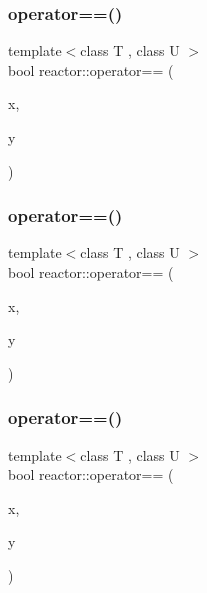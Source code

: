\mbox{\label{namespacereactor_ab9c3123244fedcd98c92e38874bee37d}} 
\subsubsection{\texorpdfstring{operator==()}{operator==()}\hspace{0.1cm}{\footnotesize\ttfamily [4/11]}}
{\footnotesize\ttfamily template$<$class T , class U $>$ \\
bool reactor\+::operator== (\begin{DoxyParamCaption}\item[{const \hyperlink{classreactor_1_1MutableValuePtr}{Mutable\+Value\+Ptr}$<$ T $>$ \&}]{x,  }\item[{const \hyperlink{classreactor_1_1MutableValuePtr}{Mutable\+Value\+Ptr}$<$ U $>$ \&}]{y }\end{DoxyParamCaption})}

\mbox{\label{namespacereactor_a2fdf4cb9154560eba99721c91aa766cc}} 
\subsubsection{\texorpdfstring{operator==()}{operator==()}\hspace{0.1cm}{\footnotesize\ttfamily [5/11]}}
{\footnotesize\ttfamily template$<$class T , class U $>$ \\
bool reactor\+::operator== (\begin{DoxyParamCaption}\item[{const \hyperlink{classreactor_1_1ImmutableValuePtr}{Immutable\+Value\+Ptr}$<$ T $>$ \&}]{x,  }\item[{const \hyperlink{classreactor_1_1ImmutableValuePtr}{Immutable\+Value\+Ptr}$<$ U $>$ \&}]{y }\end{DoxyParamCaption})}

\mbox{\label{namespacereactor_ab088f033423a22b03f5f6f76ecb04b1b}} 
\subsubsection{\texorpdfstring{operator==()}{operator==()}\hspace{0.1cm}{\footnotesize\ttfamily [6/11]}}
{\footnotesize\ttfamily template$<$class T , class U $>$ \\
bool reactor\+::operator== (\begin{DoxyParamCaption}\item[{const \hyperlink{classreactor_1_1ImmutableValuePtr}{Immutable\+Value\+Ptr}$<$ T $>$ \&}]{x,  }\item[{const \hyperlink{classreactor_1_1MutableValuePtr}{Mutable\+Value\+Ptr}$<$ U $>$ \&}]{y }\end{DoxyParamCaption})}

